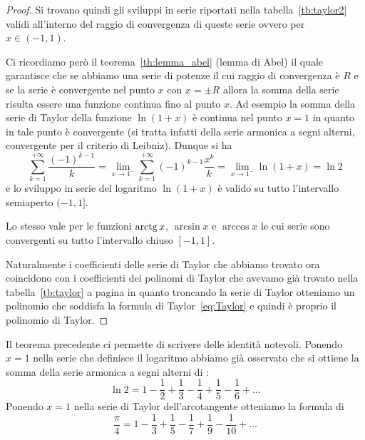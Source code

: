 \begin{proof}
  Si trovano quindi gli sviluppi in serie riportati nella tabella~\ref{tb:taylor2}
  validi all'interno del raggio di convergenza di queste serie ovvero per $x\in (-1,1)$.

  Ci ricordiamo però il teorema~\ref{th:lemma_abel} (lemma di Abel) il quale 
  garantisce che se abbiamo una serie di potenze il cui raggio di convergenza 
  è $R$ e se la serie è convergente nel punto $x$ con $x=\pm R$ allora 
  la somma della serie risulta essere una funzione continua fino al punto $x$.
  Ad esempio la somma della serie di Taylor della funzione $\ln(1+x)$
  è continua nel punto $x=1$ in quanto in tale punto è convergente 
  (si tratta infatti della serie armonica a segni alterni, 
  convergente per il criterio di Leibniz). 
  Dunque si ha 
  \begin{equation}\label{eq:somma_serie_leibniz}
    \sum_{k=1}^{+\infty} \frac{(-1)^{k-1}} k 
    = \lim_{x\to 1^-} \sum_{k=1}^{+\infty} (-1)^{k-1} \frac{x^k}{k}
    = \lim_{x\to 1^-} \ln (1+x) = \ln 2 
  \end{equation}
  e lo sviluppo in serie del logaritmo $\ln(1+x)$ è valido su 
  tutto l'intervallo semiaperto $(-1,1]$. 

  Lo stesso vale per le funzioni $\operatorname{arctg} x$, $\arcsin x$ e $\arccos x$ le cui serie 
  sono convergenti su tutto l'intervallo chiuso $[-1,1]$.

  Naturalmente i coefficienti delle serie di Taylor che abbiamo trovato ora
  coincidono con i coefficienti 
  dei polinomi di Taylor che avevamo già trovato nella tabella~\ref{tb:taylor}
  a pagina \pageref{tb:taylor} in quanto troncando la serie di Taylor otteniamo 
  un polinomio che soddisfa la formula di Taylor~\eqref{eq:Taylor} 
  e quindi è proprio il polinomio di Taylor.
\end{proof}

Il teorema precedente ci permette di scrivere delle identità notevoli. 
Ponendo $x=1$ nella serie che definisce il logaritmo abbiamo già osservato 
che si ottiene la somma della serie armonica a segni alterni di :
%
%
%
%
\begin{equation}\label{eq:serie_ln2}
  \ln 2 = 1 - \frac 1 2 + \frac 1 3 - \frac 1 4 + \frac 1 5 - \frac 1 6 + \dots
\end{equation}
Ponendo $x=1$ nella serie di Taylor dell'arcotangente otteniamo 
la formula di 
%
%
%
%
\[
  \frac \pi 4 =
   1 - \frac 1 3 + \frac 1 5 - \frac 1 7 + \frac 1 9 - \frac 1 {10} + \dots
\]

